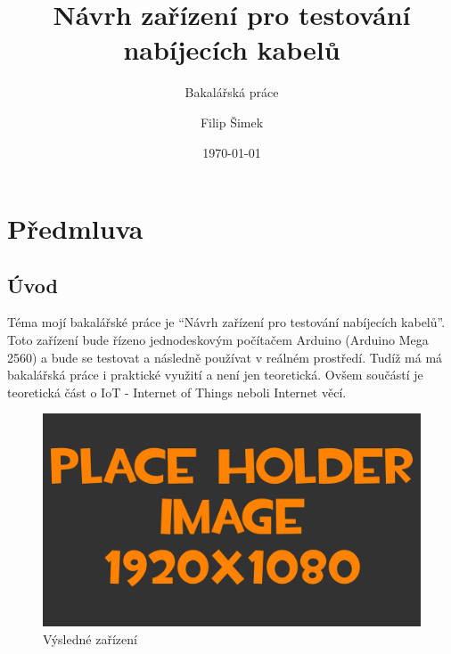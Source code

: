 \documentclass[12pt,a4paper,titlepage]{scrreprt}
\title{\vspace{6cm}Návrh zařízení pro testování nabíjecích kabelů}
\subtitle{Bakalářská práce}
\author{Filip Šimek}
\date{\today}
\newcommand{\ardMeg}{Arduino Mega 2560}
\begin{document}
	\maketitle 

	\tableofcontents
	\newpage
	
	
	
	
	\chapter{Předmluva}
	\section {Úvod}
	Téma mojí bakalářské práce je “Návrh zařízení pro testování nabíjecích kabelů”. Toto zařízení bude řízeno jednodeskovým počítačem Arduino (\ardMeg) a bude se testovat a následně používat v reálném prostředí. Tudíž má má bakalářská práce i praktické využití a není jen teoretická. Ovšem součástí je teoretická část o IoT - Internet of Things neboli Internet věcí.
	
	\begin{figure}[h!]
		\centering
		\includegraphics[width=\textwidth]{pictures/placeHolderFHD.png}
	    	\caption{Výsledné zařízení}
	   	\label{fig:projektFinal}
	\end{figure}
	
\end{document}
